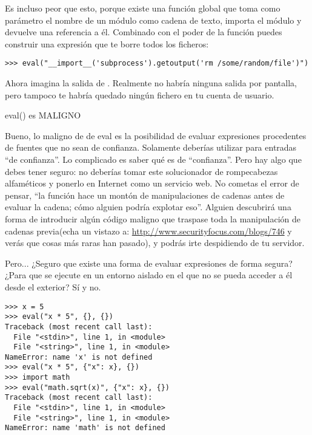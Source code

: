 Es incluso peor que esto, porque existe una función global  que toma como parámetro el nombre de un módulo como cadena de texto, importa el módulo y devuelve una referencia a él. Combinado con el poder de la función  puedes construir una expresión que te borre todos los ficheros:

\noindent\begin{minipage}{\textwidth}
\begin{lstlisting}[mathescape=True]
>>> eval("__import__('subprocess').getoutput('rm /some/random/file')")
\end{lstlisting}
\end{minipage}

Ahora imagina la salida de . Realmente no habría ninguna salida por pantalla, pero tampoco te habría quedado ningún fichero en tu cuenta de usuario.

{

\Huge \center eval() es MALIGNO

}

Bueno, lo maligno de de eval es la posibilidad de evaluar expresiones procedentes de fuentes que no sean de confianza.  Solamente deberías utilizar  para entradas ``de confianza''. Lo complicado es saber qué es de ``confianza''. Pero hay algo que debes tener seguro: no deberías tomar este solucionador de rompecabezas alfaméticos y ponerlo en Internet como un servicio web. No cometas el error de pensar, ``la función hace un montón de manipulaciones de cadenas antes de evaluar la cadena;  cómo alguien podría explotar eso''. Alguien descubrirá una forma de introducir algún código maligno que traspase toda la manipulación de cadenas previa(echa un vistazo a: \href{http://www.securityfocus.com/blogs/746}{http://www.securityfocus.com/blogs/746} y verás que cosas más raras han pasado), y podrás irte despidiendo de tu servidor.

Pero... ¿Seguro que existe una forma de evaluar expresiones de forma segura? ¿Para que  se ejecute en un entorno aislado en el que no se pueda acceder a él desde el exterior? Sí y no.

\noindent\begin{minipage}{\textwidth}
\begin{lstlisting}[mathescape=True]
>>> x = 5
>>> eval("x * 5", {}, {})
Traceback (most recent call last):
  File "<stdin>", line 1, in <module>
  File "<string>", line 1, in <module>
NameError: name 'x' is not defined
>>> eval("x * 5", {"x": x}, {})
>>> import math
>>> eval("math.sqrt(x)", {"x": x}, {})
Traceback (most recent call last):
  File "<stdin>", line 1, in <module>
  File "<string>", line 1, in <module>
NameError: name 'math' is not defined
\end{lstlisting}
\end{minipage}

